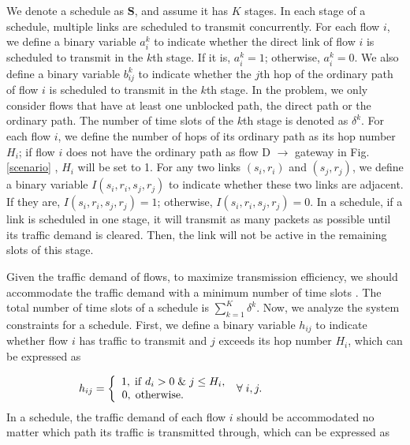 \documentclass[journal]{IEEEtran}
\begin{document}
 We denote a schedule as $\textbf{S}$, and
assume it has $K$ stages. In each stage of a schedule, multiple links are scheduled to transmit
concurrently. For each flow $i$, we define a binary variable $a_i^k$ to indicate whether the direct
link of flow $i$ is scheduled to transmit in the $k$th stage. If it is, $a_i^k=1$; otherwise,
$a_i^k=0$. We also define a binary variable $b_{ij}^k$ to indicate whether the $j$th hop of the
ordinary path of flow $i$ is scheduled to transmit in the $k$th stage. In the problem, we only
consider flows that have at least one unblocked path, the direct path or the ordinary path. The
number of time slots of the $k$th stage is denoted as $\delta ^k$. For each flow $i$, we define the
number of hops of its ordinary path as its hop number $H_i$; if flow $i$ does not have the ordinary
path as flow D $\to$ gateway in Fig. \ref{scenario} , $H_i$ will be set to 1. For any two links
$(s_i,r_i)$ and $(s_j,r_j)$, we define a binary variable $I(s_i,r_i,s_j,r_j)$ to indicate whether
these two links are adjacent. If they are, $I(s_i,r_i,s_j,r_j)=1$; otherwise,
$I(s_i,r_i,s_j,r_j)=0$. In a schedule, if a link is scheduled in one stage, it will transmit as
many packets as possible until its traffic demand is cleared. Then, the link will not be active in
the remaining slots of this stage.

Given the traffic demand of flows, to maximize transmission efficiency, we should accommodate the
traffic demand with a minimum number of time slots \cite{mao}. The total number of time slots of a schedule is
$\sum\limits_{k = 1}^K {{\delta ^k}} $. Now, we analyze the system constraints for a schedule.
First, we define a binary variable $h_{ij}$ to indicate whether flow $i$ has traffic to transmit
and $j$ exceeds its hop number $H_i$, which can be expressed as

\begin{equation}
{h_{ij}} = \left\{ {\begin{array}{*{20}{c}}
{1,\;{\rm{if}}\;{d_i} > 0\;\&\;j \le {H_i}},\\
{0,\;{\rm{otherwise}}.\hspace{1.3cm}}
\end{array}} \right.\;\forall \;i,j.\hspace{2.2cm}\label{CONS1}
\end{equation}
In a schedule, the traffic demand of each flow $i$ should be accommodated no matter which path its
traffic is transmitted through, which can be expressed as
\end{document}
